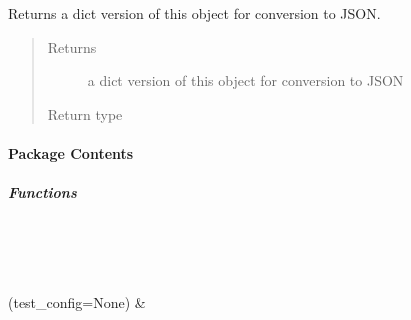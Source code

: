 \documentclass[letterpaper,10pt,english]{sphinxmanual}
\begin{document}
\begin{fulllineitems}
\begin{fulllineitems}
\end{fulllineitems}


\begin{fulllineitems}
\label{\detokenize{autoapi/pine/backend/models/index:pine.backend.models.CollectionUserPermissions.to_dict}}
\sphinxAtStartPar
Returns a dict version of this object for conversion to JSON.
\begin{quote}\begin{description}
\item[{Returns}] \leavevmode
\sphinxAtStartPar
a dict version of this object for conversion to JSON

\item[{Return type}] \leavevmode
\sphinxAtStartPar
{}

\end{description}\end{quote}

\end{fulllineitems}


\end{fulllineitems}



\paragraph{Package Contents}
\label{\detokenize{autoapi/pine/backend/index:package-contents}}

\subparagraph{Functions}
\label{\detokenize{autoapi/pine/backend/index:functions}}

\begin{savenotes}\sphinxatlongtablestart\begin{longtable}[c]{}
\hline

\endfirsthead

%
{}\\
\hline

\endhead

\hline
{}\\
\endfoot

\endlastfoot

\sphinxAtStartPar
{\hyperref[\detokenize{autoapi/pine/backend/index:pine.backend.create_app}]{}}(test\_config=None)
&
\sphinxAtStartPar

\\
\hline
\end{longtable}\sphinxatlongtableend\end{savenotes}
\end{document}
